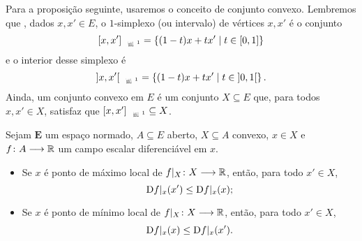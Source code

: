 Para a proposição seguinte, usaremos o conceito de conjunto convexo.%
Lembremos que%
, dados $x,x' \in E$, o $1$-simplexo (ou intervalo) de vértices $x,x'$ é o conjunto
	\begin{equation*}
	\Sxger{x,x'} = \set{(1-t)x + tx'}{t \in \intff{0}{1}}
	\end{equation*}
e o interior desse simplexo é
	\begin{equation*}
	\Sxgera{x,x'} = \set{(1-t)x + tx'}{t \in \intaa{0}{1}}.
	\end{equation*}
Ainda, um conjunto convexo em $E$ é um conjunto $X \subseteq E$ que, para todos $x,x' \in X$, satisfaz que $\Sxger{x,x'} \subseteq X$.

\begin{proposition}
\label{prop:extremo.local.diferencial}
Sejam $\bm E$ um espaço normado, $A \subseteq E$ aberto, $X \subseteq A$ convexo, $x \in X$ e ${f}\colon {A} \longrightarrow {\mathbb{R}}$ um campo escalar diferenciável em $x$.
	\begin{itemize}
		\item Se $x$ é ponto de máximo local de ${f|_X}\colon {X} \longrightarrow {\mathbb{R}}$, então, para todo $x' \in X$,
			\begin{equation*}
			\mathrm{D} f|_x(x') \leq \mathrm{D} f|_x(x);
			\end{equation*}
		\item Se $x$ é ponto de mínimo local de ${f|_X}\colon {X} \longrightarrow {\mathbb{R}}$, então, para todo $x' \in X$,
			\begin{equation*}
			\mathrm{D} f|_x(x) \leq \mathrm{D} f|_x(x').
			\end{equation*}
	\end{itemize}
\end{proposition}
